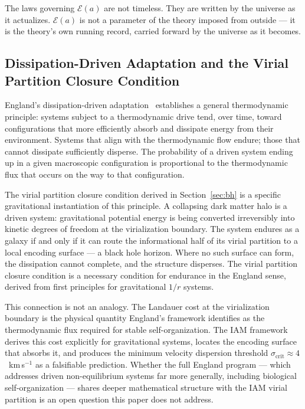 \documentclass[12pt,a4paper]{article}
\begin{document}
The laws governing $\mathcal{E}(a)$ are not timeless. They are written by
the universe as it actualizes. $\mathcal{E}(a)$ is not a parameter of the
theory imposed from outside --- it is the theory's own running record,
carried forward by the universe as it becomes.

\subsection{Dissipation-Driven Adaptation and the Virial Partition Closure Condition}

England's dissipation-driven adaptation~\citep{England2013,England2015}
establishes a general thermodynamic principle: systems subject to a
thermodynamic drive tend, over time, toward configurations that more
efficiently absorb and dissipate energy from their environment. Systems
that align with the thermodynamic flow endure; those that cannot dissipate
sufficiently disperse. The probability of a driven system ending up in a
given macroscopic configuration is proportional to the thermodynamic flux
that occurs on the way to that configuration.

The virial partition closure condition derived in Section~\ref{sec:bh}
is a specific gravitational instantiation of this principle. A collapsing
dark matter halo is a driven system: gravitational potential energy is
being converted irreversibly into kinetic degrees of freedom at the
virialization boundary. The system endures as a galaxy if and only if
it can route the informational half of its virial partition to a local
encoding surface --- a black hole horizon. Where no such surface can
form, the dissipation cannot complete, and the structure disperses. The
virial partition closure condition is a necessary condition for endurance
in the England sense, derived from first principles for gravitational
$1/r$ systems.

This connection is not an analogy. The Landauer cost at the virialization
boundary is the physical quantity England's framework identifies as the
thermodynamic flux required for stable self-organization. The IAM
framework derives this cost explicitly for gravitational systems, locates
the encoding surface that absorbs it, and produces the minimum velocity
dispersion threshold $\sigma_\mathrm{crit} \approx 4$~km\,s$^{-1}$ as
a falsifiable prediction. Whether the full England program --- which
addresses driven non-equilibrium systems far more generally, including
biological self-organization --- shares deeper mathematical structure with
the IAM virial partition is an open question this paper does not address.
\end{document}
